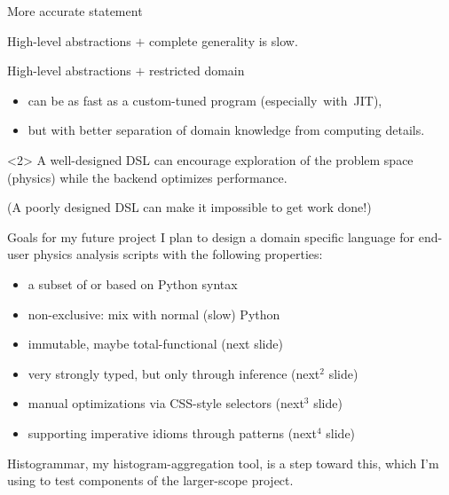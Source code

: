 \documentclass{beamer}
\begin{document}
\begin{frame}{More accurate statement}

\vfill
High-level abstractions $+$ complete generality is slow.

\vfill
High-level abstractions $+$ restricted domain
\begin{itemize}
\item can be as fast as a custom-tuned program \mbox{(especially with JIT),\hspace{-1 cm}}
\item but with better separation of domain knowledge from computing details.
\end{itemize}

\vfill
\begin{uncoverenv}<2>
A well-designed DSL can encourage exploration of the problem space (physics) while the backend optimizes performance.

\vspace{0.25 cm}
(A poorly designed DSL can make it impossible to get work done!)
\end{uncoverenv}
\end{frame}

\begin{frame}{Goals for my future project}
\vfill
I plan to design a domain specific language for end-user physics analysis scripts with the following properties:

\vspace{0.2 cm}
\begin{itemize}
\item a subset of or based on Python syntax
\item non-exclusive: mix with normal (slow) Python
\item immutable, maybe total-functional (next slide)
\item very strongly typed, but only through inference (next$^2$ slide)
\item manual optimizations via CSS-style selectors (next$^3$ slide)
\item supporting imperative idioms through patterns (next$^4$ slide)
\end{itemize}

\vfill
Histogrammar, my histogram-aggregation tool, is a step toward this, which I'm using to test components of the larger-scope project.
\end{frame}
\end{document}
